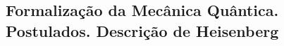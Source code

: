 \subsection{Formalização da Mecânica Quântica. Postulados. Descrição de Heisenberg}
\label{ssec:axioms_heisenberg}
